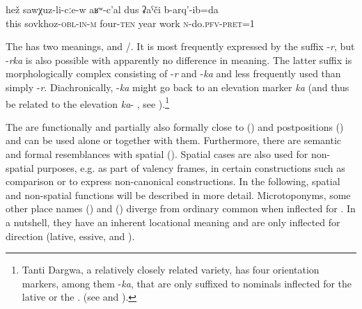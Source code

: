 \begin{exe}
	\ex	\label{ex:In the sovkhoz I worked for 40 years}
	\gll	hež	sawχuz-li-cːe-w	aʁʷ-c'al	dus	ʡaˁči	b-arq'-ib=da \\
		this	sovkhoz-\textsc{obl}-\textsc{in}-\textsc{m}	four-\textsc{ten}	year	work	\textsc{n}-do.\textsc{pfv}-\textsc{pret}=1\\
	\glt	{}
\end{exe} 

The  has two meanings,  and \slash{}. It is most frequently expressed by the suffix -\textit{r}, but -\textit{rka} is also possible with apparently no difference in meaning. The latter suffix is morphologically complex consisting of -\textit{r} and -\textit{ka} and less frequently used than simply -\textit{r}. Diachronically, -\textit{ka} might go back to an elevation marker \textit{ka}  (and thus be related to the elevation  \textit{ka}- , see ).\footnote{Tanti Dargwa, a relatively closely related variety, has four orientation markers, among them -\textit{ka}, that are only suffixed to nominals inflected for the lative or the . (see \citealp[69]{Sumbatova.Lander2014} and \citealp{ForkerLTSanzhi}).} 

The  are functionally and partially also formally close to  () and postpositions () and can be used alone or together with them. Furthermore, there are semantic and formal resemblances with spatial  (). Spatial cases are also used for non-spatial purposes, e.g. as part of valency frames, in certain constructions such as comparison or to express non-canonical  constructions. In the following, spatial and non-spatial functions will be described in more detail. Microtoponyms, some other place names () and  () diverge from ordinary common  when inflected for . In a nutshell, they have an inherent locational meaning and are only inflected for direction (lative, essive, and ).



